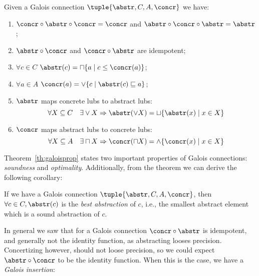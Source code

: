 \begin{theorem}\label{th:galoisprop}
  Given a Galois connection \(\tuple{\abstr, C, A, \concr}\) we have:
  \begin{enumerate}
  \item \(\concr \circ \abstr \circ \concr = \concr\) and
    \(\abstr \circ \concr \circ \abstr = \abstr\);
  \item \(\abstr \circ \concr\) and \(\concr \circ \abstr\) are
    idempotent;
  \item \(\forall c \in C\)
    \(\abstr(c) = \sqcap \{a \mid c \leq \concr(a)\}\);
  \item \(\forall a \in A\)
    \(\concr(a) = \vee \{ c \mid \abstr(c) \sqsubseteq a \}\);
  \item \(\abstr\) maps concrete lubs to abstract lubs:
    \begin{equation*}
      \forall X \subseteq C \quad \exists \vee X \Rightarrow \abstr(\vee X) = \sqcup \{\abstr(x) \mid x \in X\}
    \end{equation*}
  \item \(\concr\) maps abstract lubs to concrete lubs:
    \begin{equation*}
      \forall X \subseteq A \quad \exists \sqcap X \Rightarrow \concr(\sqcap X) = \wedge \{\concr(x) \mid x \in X\}
    \end{equation*}
  \end{enumerate}
\end{theorem}

Theorem~\ref{th:galoisprop} states two important properties of Galois
connections: \emph{soundness} and \emph{optimality}. Additionally, from
the theorem we can derive the following corollary:

\begin{corollary}\label{co:bestabstr}
  If we have a Galois connection \(\tuple{\abstr, C, A, \concr}\),
  then \(\forall c \in C, \abstr(c)\) is the \emph{best abstraction}
  of \(c\), i.e., the smallest abstract element which is a sound
  abstraction of \(c\).
\end{corollary}

In general we saw that for a Galois connection \(\concr \circ \abstr\)
is idempotent, and generally not the identity function, as abstracting
looses precision. Concertizing however, should not loose precision, so
we could expect \(\abstr \circ \concr\) to be the identity
function. When this is the case, we have a \emph{Galois insertion}:

